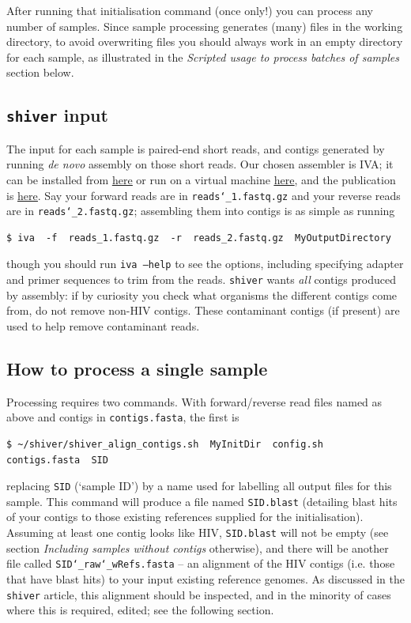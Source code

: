 \documentclass{article}
\newcommand{\shiv}{\texttt{shiver}\xspace}
\let\c\texttt
\newcommand{\www}{\color{blue} \underline}
\begin{document}
After running that initialisation command (once only!) you can process any number of samples.
Since sample processing generates (many) files in the working directory, to avoid overwriting files you should always work in an empty directory for each sample, as illustrated in the {\it Scripted usage to process batches of samples} section below.

\subsection*{\shiv input}
The input for each sample is paired-end short reads, and contigs generated by running {\it de novo} assembly on those short reads.
Our chosen assembler is IVA; it can be installed from \href{http://sanger-pathogens.github.io/iva/}{\www{here}} or run on a virtual machine \href{http://sanger-pathogens.github.io/pathogens-vm/}{\www{here}}, and the publication is \href{http://bioinformatics.oxfordjournals.org/content/early/2015/02/27/bioinformatics.btv120.abstract}{\www{here}}.
Say your forward reads are in \c{reads\char`_1.fastq.gz} and your reverse reads are in \c{reads\char`_2.fastq.gz}; assembling them into contigs is as simple as running
\begin{Verbatim}[samepage=true]
$ iva  -f  reads_1.fastq.gz  -r  reads_2.fastq.gz  MyOutputDirectory
\end{Verbatim}
though you should run \c{iva --help} to see the options, including specifying adapter and primer sequences to trim from the reads.
\shiv wants {\it all} contigs produced by assembly: if by curiosity you check what organisms the different contigs come from, do not remove non-HIV contigs.
These contaminant contigs (if present) are used to help remove contaminant reads.

\subsection*{How to process a single sample}
Processing requires two commands.
With forward/reverse read files named as above and contigs in \c{contigs.fasta}, the first is  
\begin{Verbatim}[samepage=true]
$ ~/shiver/shiver_align_contigs.sh  MyInitDir  config.sh  contigs.fasta  SID
\end{Verbatim}
replacing \c{SID} (`sample ID') by a name used for labelling all output files for this sample.
This command will produce a file named \c{SID.blast} (detailing blast hits of your contigs to those existing references supplied for the initialisation).
Assuming at least one contig looks like HIV, \c{SID.blast} will not be empty (see section {\it Including samples without contigs} otherwise), and there will be another file called \c{SID\char`_raw\char`_wRefs.fasta} -- an alignment of the HIV contigs (i.e. those that have blast hits) to your input existing reference genomes.
As discussed in the \shiv article, this alignment should be inspected, and in the minority of cases where this is required, edited; see the following section.
\end{document}
